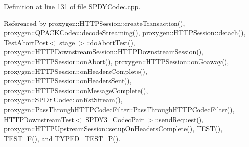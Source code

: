 Definition at line 131 of file S\+P\+D\+Y\+Codec.\+cpp.



Referenced by proxygen\+::\+H\+T\+T\+P\+Session\+::create\+Transaction(), proxygen\+::\+Q\+P\+A\+C\+K\+Codec\+::decode\+Streaming(), proxygen\+::\+H\+T\+T\+P\+Session\+::detach(), Test\+Abort\+Post$<$ stage $>$\+::do\+Abort\+Test(), proxygen\+::\+H\+T\+T\+P\+Downstream\+Session\+::\+H\+T\+T\+P\+Downstream\+Session(), proxygen\+::\+H\+T\+T\+P\+Session\+::on\+Abort(), proxygen\+::\+H\+T\+T\+P\+Session\+::on\+Goaway(), proxygen\+::\+H\+T\+T\+P\+Session\+::on\+Headers\+Complete(), proxygen\+::\+H\+T\+T\+P\+Session\+::on\+Headers\+Sent(), proxygen\+::\+H\+T\+T\+P\+Session\+::on\+Message\+Complete(), proxygen\+::\+S\+P\+D\+Y\+Codec\+::on\+Rst\+Stream(), proxygen\+::\+Pass\+Through\+H\+T\+T\+P\+Codec\+Filter\+::\+Pass\+Through\+H\+T\+T\+P\+Codec\+Filter(), H\+T\+T\+P\+Downstream\+Test$<$ S\+P\+D\+Y3\+\_\+Codec\+Pair $>$\+::send\+Request(), proxygen\+::\+H\+T\+T\+P\+Upstream\+Session\+::setup\+On\+Headers\+Complete(), T\+E\+S\+T(), T\+E\+S\+T\+\_\+\+F(), and T\+Y\+P\+E\+D\+\_\+\+T\+E\+S\+T\+\_\+\+P().

